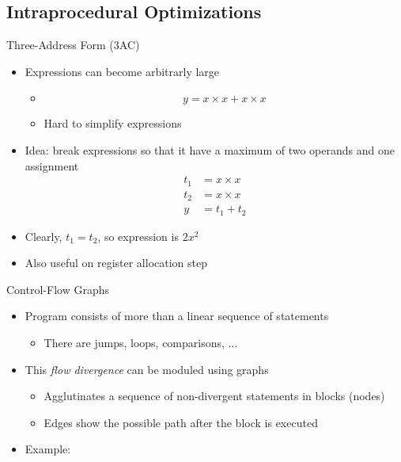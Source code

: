 \subsection{Intraprocedural Optimizations}
\begin{frame}{Three-Address Form (3AC)}
\begin{itemize}
    \item Expressions can become arbitrarly large \vspace*{-0.5cm}
    \begin{itemize}
        \item[] $$y = x \times x + x \times x$$ \vspace*{-0.3cm}
        \item Hard to simplify expressions
    \end{itemize}
    \item Idea: break expressions so that it have a maximum of two operands
    and one assignment \vspace*{-0.3cm}
    \begin{align}
          t_1 &= x \times x \nonumber \\
          t_2 &= x \times x \nonumber \\
            y &= t_1 + t_2 \nonumber
    \end{align} \vspace*{-0.6cm}
    \item Clearly, $t_1 = t_2$, so expression is $2x^2$
    \item Also useful on register allocation step
\end{itemize}
\end{frame}


\begin{frame}{Control-Flow Graphs}
\begin{itemize}
    \item Program consists of more than a linear sequence of statements
    \begin{itemize}
        \item There are jumps, loops, comparisons, ...
    \end{itemize}
    \item This \textit{flow divergence} can be moduled using graphs
    \begin{itemize}
        \item Agglutinates a sequence of non-divergent statements in blocks (nodes)
        \item Edges show the possible path after the block is executed
    \end{itemize}
    \item Example:
\end{itemize}
\end{frame}

